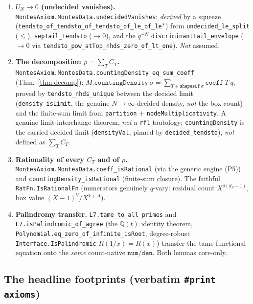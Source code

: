 \documentclass[11pt]{article}
\theoremstyle{definition}
\theoremstyle{remark}
\begin{document}
\begin{enumerate}[label=\textup{(P\arabic*)},leftmargin=*]
\item\textbf{$U_N\to0$ (undecided vanishes).}
\texttt{MontesAxiom.MontesData.undecidedVanishes}: \emph{derived} by a squeeze
(\texttt{tendsto\_of\_tendsto\_of\_tendsto\_of\_le\_of\_le'}) from
\texttt{undecided\_le\_split} ($\le$), \texttt{sepTail\_tendsto} ($\to0$), and the
$q^{-N}$ \texttt{discriminantTail\_envelope} ($\to0$ via
\texttt{tendsto\_pow\_atTop\_nhds\_zero\_of\_lt\_one}). \emph{Not} assumed.

\item\textbf{The decomposition $\rho=\sum_T C_T$.}
\texttt{MontesAxiom.MontesData.countingDensity\_eq\_sum\_coeff} (Thm.~\ref{thm:decomp}):
$M.\texttt{countingDensity}\ \sigma = \sum_{T\in\texttt{shapesOf}\ \sigma}\texttt{coeff}\ T\ q$,
proved by \texttt{tendsto\_nhds\_unique} between the decided limit
(\texttt{density\_isLimit}, the genuine $N\to\infty$ decided density, \emph{not} the
box count) and the finite-sum limit from \texttt{partition} $+$
\texttt{nodeMultiplicativity}. A genuine limit-interchange theorem, \emph{not} a
\texttt{rfl} tautology; \texttt{countingDensity} is the carried decided limit
(\texttt{densityVal}, pinned by \texttt{decided\_tendsto}), \emph{not} defined as
$\sum_T C_T$.

\item\textbf{Rationality of every $C_T$ and of $\rho$.}
\texttt{MontesAxiom.MontesData.coeff\_isRational} (via the generic engine (P5)) and
\texttt{countingDensity\_isRational} (finite-sum closure). The faithful
\texttt{RatFn.IsRationalFn} (numerators genuinely $q$-vary: residual count
$X^{\delta(d_S-1)}$, box value $(X-1)^V/X^{V+A}$).

\item\textbf{Palindromy transfer.} \texttt{L7.tame\_to\_all\_primes} and
\texttt{L7.isPalindromic\_of\_agree} (the $\mathbb Q(t)$ identity theorem,
\texttt{Polynomial.eq\_zero\_of\_infinite\_isRoot}, degree-robust
\texttt{Interface.IsPalindromic} $R(1/x)=R(x)$) transfer the tame functional equation
onto the \emph{same} count-native $\texttt{num}/\texttt{den}$. Both lemmas core-only.
\end{enumerate}

\subsection{The headline footprints (verbatim \texttt{\#print axioms})}\label{sec:footprints}
\end{document}
